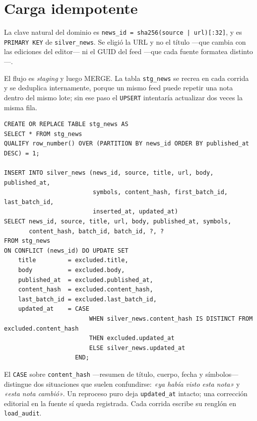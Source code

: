 \documentclass[11pt,a4paper]{article}
\begin{document}
\section{Carga idempotente}

La clave natural del dominio es \texttt{news\_id = sha256(source | url)[:32]}, y
es \texttt{PRIMARY KEY} de \texttt{silver\_news}. Se eligió la URL y no el
título ---que cambia con las ediciones del editor--- ni el GUID del feed ---que
cada fuente formatea distinto---.

El flujo es \emph{staging} y luego MERGE. La tabla \texttt{stg\_news} se recrea
en cada corrida y se deduplica internamente, porque un mismo feed puede repetir
una nota dentro del mismo lote; sin ese paso el \texttt{UPSERT} intentaría
actualizar dos veces la misma fila.

\begin{lstlisting}[language=sqlite, caption={Deduplicación en staging y MERGE por clave natural (\texttt{silver.py}).}]
CREATE OR REPLACE TABLE stg_news AS
SELECT * FROM stg_news
QUALIFY row_number() OVER (PARTITION BY news_id ORDER BY published_at DESC) = 1;

INSERT INTO silver_news (news_id, source, title, url, body, published_at,
                         symbols, content_hash, first_batch_id, last_batch_id,
                         inserted_at, updated_at)
SELECT news_id, source, title, url, body, published_at, symbols,
       content_hash, batch_id, batch_id, ?, ?
FROM stg_news
ON CONFLICT (news_id) DO UPDATE SET
    title         = excluded.title,
    body          = excluded.body,
    published_at  = excluded.published_at,
    content_hash  = excluded.content_hash,
    last_batch_id = excluded.last_batch_id,
    updated_at    = CASE
                        WHEN silver_news.content_hash IS DISTINCT FROM excluded.content_hash
                        THEN excluded.updated_at
                        ELSE silver_news.updated_at
                    END;
\end{lstlisting}

El \texttt{CASE} sobre \texttt{content\_hash} ---resumen de título, cuerpo, fecha
y símbolos--- distingue dos situaciones que suelen confundirse: \emph{«ya había
visto esta nota»} y \emph{«esta nota cambió»}. Un reproceso puro deja
\texttt{updated\_at} intacto; una corrección editorial en la fuente sí queda
registrada. Cada corrida escribe su renglón en \texttt{load\_audit}.
\end{document}
